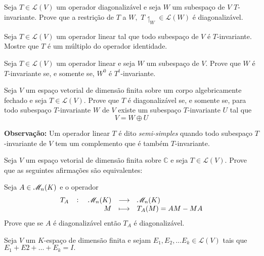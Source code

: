\documentclass[11pt,a4paper]{article}
\begin{document}
    
  \solucao{}
   
     Seja $T \in \mathcal{L}(V)$ um operador diagonalizável e seja $W$ um subespaço de $V$ $T$-invariante. Prove que a restrição de $T$ a $W,$ $T \upharpoonleft_W \in \mathcal{L}(W)$ é diagonalizável.
    
  \solucao{}
   
     Seja $T \in \mathcal{L}(V)$ um operador linear tal que todo subespaço de $V$ é $T$-invariante. Mostre que $T$ é um múltiplo do operador identidade.

\solucao{}
   
     Seja $T \in \mathcal{L}(V)$ um operador linear e seja $W$ um subespaço de $V.$ Prove que $W$ é $T$-invariante se, e somente se, $W^0$ é $T^t$-invariante.
    
\solucao{}
   
     Seja $V$ um espaço vetorial de dimensão finita sobre um corpo algebricamente fechado e seja $T \in \mathcal{L}(V).$ Prove que $T$ é diagonalizável se, e somente se, para todo subespaço $T$-invariante $W$ de $V$ existe um subespaço $T$-invariante $U$ tal que 
    \[
    V = W \oplus U
    \]
    
\textbf{Observação:} Um operador linear $T$ é dito \emph{semi-simples} quando todo subespaço $T$-invariante de $V$ tem um complemento que é também $T$-invariante.

\solucao{}
   
     Seja $V$ um espaço vetorial de dimensão finita sobre $\mathbb{C}$ e seja $T \in \mathcal{L}(V).$ Prove que as seguintes afirmações são equivalentes:
        \solucao{}
   
     Seja $A \in \mathcal{M}_{n}(K)$ e o operador
    \[
    \fullfunction{T_A}{\m{n}{K}}{\m{n}{K}}{M}{T_A(M) = AM - MA}
    \]
Prove que se $A$ é diagonalizável então $T_A$ é diagonalizável. 

        \solucao{}
   
     Seja $V$ um $K$-espaço de dimensão finita e sejam $E_1, E_2, \ldots E_k \in \mathcal{L}(V)$ tais que $E_1 + E2 + \ldots + E_k = I.$
   
\end{document}
